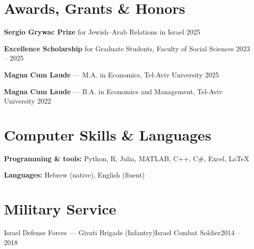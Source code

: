 \documentclass[a4paper, 10pt]{article}
\begin{document}
\section{Awards, Grants \& Honors}
\cvPlain
\item \textbf{Sergio Grywac Prize} for Jewish--Arab Relations in Israel \hfill 2025
\item \textbf{Excellence Scholarship} for Graduate Students, Faculty of Social Sciences \hfill 2023 -- 2025
\item \textbf{Magna Cum Laude} --- M.A. in Economics, Tel-Aviv University \hfill 2025
\item \textbf{Magna Cum Laude} --- B.A. in Economics and Management, Tel-Aviv University \hfill 2022
\cvPlainEnd

\section{Computer Skills \& Languages}
\cvPlain
\item \textbf{Programming \& tools:} Python, R, Julia, MATLAB, C++, C\#, Excel, LaTeX
\item \textbf{Languages:} Hebrew (native), English (fluent)
\cvPlainEnd

\section{Military Service}
\cventry
{Israel Defense Forces --- Givati Brigade (Infantry)}{Israel}
{Combat Soldier}{2014 -- 2018}
\end{document}

